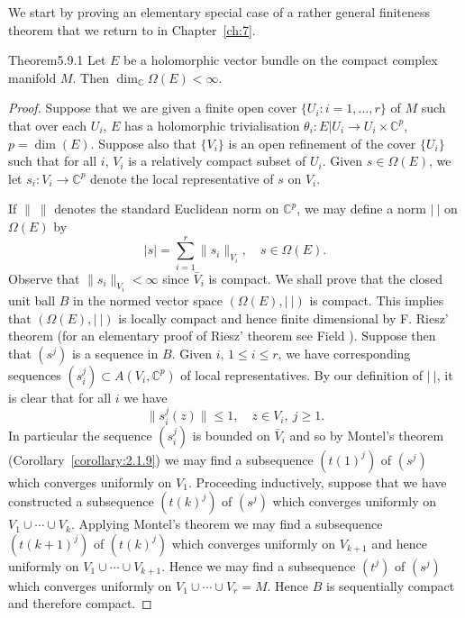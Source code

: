 We start by proving an elementary special case of a rather general finiteness theorem that we return to in Chapter~\ref{ch:7}.
\begin{originaltheorem}{Theorem}{5.9.1}
Let $E$ be a holomorphic vector bundle on the compact complex manifold $M$. Then $\dim_{\mathbb C}\Omega(E)<\infty$.
\end{originaltheorem}
\begin{proof}
Suppose that we are given a finite open cover $\{U_i:i=1,\ldots,r\}$ of $M$ such that over each $U_i$, $E$ has a holomorphic trivialisation $\theta_i:E|U_i\to U_i\times\mathbb C^p$, $p=\dim(E)$. Suppose also that $\{V_i\}$
is an open refinement of the cover $\{U_i\}$ such that for all $i$, $V_i$ is a relatively compact subset of $U_i$. Given $s\in\Omega(E)$, we let $s_i:V_i\to\mathbb C^p$ denote the local representative of $s$ on $V_i$.

If $\|\ \|$ denotes the standard Euclidean norm on $\mathbb C^p$, we may define a norm $|\ |$ on $\Omega(E)$ by
\[|s|=\sum_{i=1}^r\|s_i\|_{V_i},\quad s\in\Omega(E).\]
Observe that $\|s_i\|_{V_i}<\infty$ since $\bar V_i$ is compact. We shall prove that the closed unit ball $B$ in the normed vector space $(\Omega(E),|\ |)$ is compact. This implies that $(\Omega(E),|\ |)$ is locally compact and hence finite dimensional by F. Riesz' theorem (for an elementary proof of Riesz' theorem see Field \cite[page 54]{bib:II:field-m-j:1}). Suppose then that $(s^j)$ is a sequence in $B$. Given $i$, $1\leq i\leq r$, we have corresponding sequences $(s_i^j)\subset A(V_i,\mathbb C^p)$ of local representatives. By our definition of $|\ |$, it is clear that for all $i$ we have
\[\|s_i^j(z)\|\leq1,\quad z\in V_i,\ j\geq1.\]
In particular the sequence $(s_i^j)$ is bounded on $\bar V_i$ and so by Montel's theorem (Corollary~\ref{corollary:2.1.9}) we may find a subsequence $(t(1)^j)$ of $(s^j)$ which converges uniformly on $V_1$. Proceeding inductively, suppose that we have constructed a subsequence $(t(k)^j)$ of $(s^j)$ which converges uniformly on $V_1\cup\cdots\cup V_k$. Applying Montel's theorem we may find a subsequence $(t(k+1)^j)$ of $(t(k)^j)$ which converges uniformly on $V_{k+1}$ and hence uniformly on $V_1\cup\cdots\cup V_{k+1}$. Hence we may find a subsequence $(t^j)$ of $(s^j)$ which converges uniformly on $V_1\cup\cdots\cup V_r=M$. Hence $B$ is sequentially compact and therefore compact.
\end{proof}
